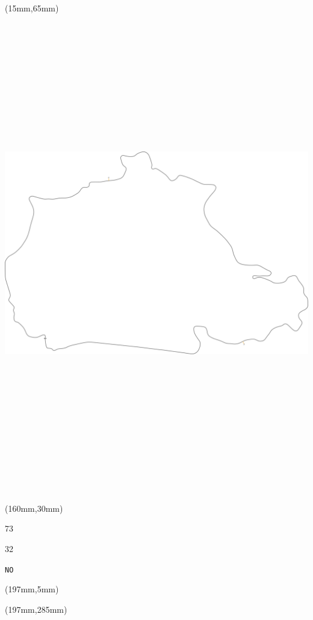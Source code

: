 \begin{textblock*}{185mm}(15mm,65mm)%
\centering
\mbox{\includegraphics[width=185mm,height=210mm,keepaspectratio]{PT/NO.pdf}}
\end{textblock*}
\begin{textblock*}{40mm}(160mm,30mm)%
\Large
\par{} 
\par73 
\par32 
\par\hfill\tiny\tt NO\\
\end{textblock*}
\begin{textblock*}{20mm}(197mm,5mm)%
\fbox{\thepage}
\label{NO}
\end{textblock*}
\begin{textblock*}{20mm}(197mm,285mm)%
\fbox{\thepage}
\end{textblock*}

